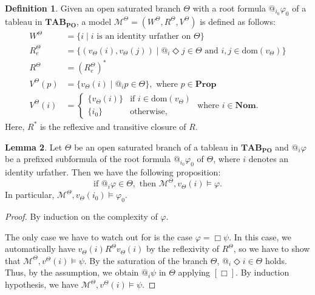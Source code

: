 \documentclass{article}
\theoremstyle{definition}
\newtheorem{definition}{Definition}[section]
\newtheorem{lemma}[definition]{Lemma}
\newcommand{\Prop}{\mathbf{Prop}}
\newcommand{\Nom}{\mathbf{Nom}}
\newcommand{\Dia}{\Diamond}
\newcommand{\Kmodel}{\mathcal{M}}
\newcommand{\dom}{\mathrm{dom}}
\newcommand{\tableauPO}{\mathbf{TAB}_{\textbf{PO}}}
\begin{document}
\begin{definition}
    Given an open saturated branch $\Theta$ with a root formula $@_{i_0} \varphi_0$ of a tableau in $\tableauPO$, a model $\Kmodel^\Theta = (W^\Theta, R^\Theta, V^\Theta)$ is defined as follows:
    \begin{align*}
        W^\Theta &= \{ i \mid i \text{ is an identity urfather on } \Theta \} \\
        R_e^\Theta &= \{ (v_\Theta(i), v_\Theta(j)) \mid @_i \Dia j \in \Theta \text{ and } i, j \in \dom(v_\Theta) \} \\
        R^\Theta &= (R_e^\Theta)^* \\
        V^\Theta(p) &= \{ v_\Theta(i) \mid @_i p \in \Theta \},\text{ where } p \in \Prop \\
        V^\Theta(i) &=
        \begin{cases}
            \{ v_\Theta(i) \} & \text{if } i \in \dom(v_\Theta) \\
            \{ i_0 \} & \text{otherwise,}
        \end{cases}
        \text{ where } i \in \Nom.
    \end{align*}
    Here, $R^*$ is the reflexive and transitive closure of $R$.
    \label{defPOtableaumodel}
\end{definition}
\begin{lemma}
    Let $\Theta$ be an open saturated branch of a tableau in $\tableauPO$ and $@_i \varphi$ be a prefixed subformula of the root formula $@_{i_0} \varphi_0$ of $\Theta$, where $i$ denotes an identity urfather. Then we have the following proposition:
    \[
        \text{if } @_i \varphi \in \Theta, \text{ then } \Kmodel^\Theta, v_\Theta(i) \models \varphi.
    \]
    In particular, $\Kmodel^\Theta, v_\Theta(i_0) \models \varphi_0$.
    \label{lemmodelexistS4As}
\end{lemma}
\begin{proof}
    By induction on the complexity of $\varphi$. 
    
    The only case we have to watch out for is the case $\varphi = \Box \psi$. In this case, we automatically have $v_\Theta(i) R^\Theta v_\Theta(i)$ by the reflexivity of $R^\Theta$, so we have to show that $\Kmodel^\Theta, v^\Theta(i) \models \psi$.
    By the saturation of the branch $\Theta$, $@_i \Dia i \in \Theta$ holds. Thus, by the assumption, we obtain $@_i \psi$ in $\Theta$ applying $[\Box]$. By induction hypothesis, we have $\Kmodel^\Theta, v^\Theta(i) \models \psi$.
\end{proof}
\end{document}
